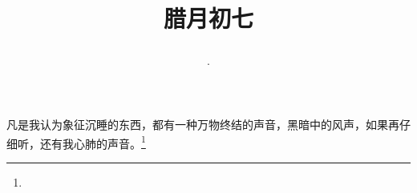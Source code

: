 \title{\date[d=17,m=1,y=2024][year:cn-y,年,month:cn,day:cn,日,·,weekday]·腊月初七 }
凡是我认为象征沉睡的东西，都有一种万物终结的声音，黑暗中的风声，如果再仔细听，还有我心肺的声音。\footnote{ }

